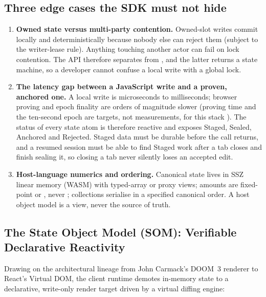\documentclass[a4paper,11pt,twoside,parskip=half-,headings=small]{scrartcl}
\begin{document}
\subsection{Three edge cases the SDK must not hide}
\begin{enumerate}
  \item \textbf{Owned state versus multi-party contention.} Owned-slot writes commit locally and deterministically because nobody else can reject them (subject to the writer-lease rule). Anything touching another actor can fail on lock contention. The API therefore separates  from , and the latter returns a state machine, so a developer cannot confuse a local write with a global lock.
  \item \textbf{The latency gap between a JavaScript write and a proven, anchored one.} A local write is microseconds to milliseconds; browser proving and epoch finality are orders of magnitude slower (proving time and the ten-second epoch are targets, not measurements, for this stack ). The status of every state atom is therefore reactive and exposes Staged, Sealed, Anchored and Rejected. Staged data must be durable before the call returns, and a resumed session must be able to find Staged work after a tab closes and finish sealing it, so closing a tab never silently loses an accepted edit.
  \item \textbf{Host-language numerics and ordering.} Canonical state lives in SSZ linear memory (WASM) with typed-array or proxy views; amounts are fixed-point  or , never ; collections serialise in a specified canonical order. A host object model is a view, never the source of truth.
\end{enumerate}

\subsection{The State Object Model (SOM): Verifiable Declarative Reactivity}
\label{sec:som_architecture}

Drawing on the architectural lineage from John Carmack's DOOM~3 renderer to React's Virtual DOM, the client runtime demotes in-memory state to a declarative, write-only render target driven by a virtual diffing engine:
\end{document}
